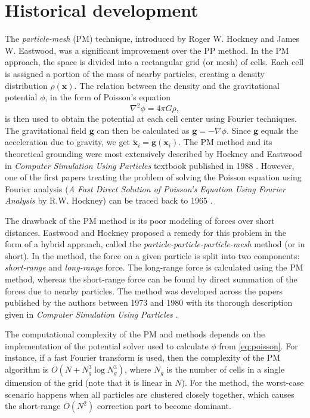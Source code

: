 \section{Historical development}\label{sec:historical-development}
The \textit{particle-mesh} (PM) technique, introduced by Roger W. Hockney and James W. Eastwood, was a significant improvement over the PP method.
In the PM approach, the space is divided into a rectangular grid (or mesh) of cells.
Each cell is assigned a portion of the mass of nearby particles, creating a density distribution $\rho(\mathbf{x})$.
The relation between the density and the gravitational potential $\phi$, in the form of Poisson's equation
\begin{equation}\label{eq:poisson}
    \nabla^2\phi = 4\pi G \rho,
\end{equation}
is then used to obtain the potential at each cell center using Fourier techniques.
The gravitational field $\mathbf{g}$ can then be calculated as $\mathbf{g} = -\nabla \phi$.
Since $\mathbf{g}$ equals the acceleration due to gravity, we get $\ddot{\mathbf{x}}_i = \mathbf{g}(\mathbf{x}_i)$.
The PM method and its theoretical grounding were most extensively described by Hockney and Eastwood in \textit{Computer Simulation Using Particles} textbook published in 1988 \cite{Hockney1988}.
However, one of the first papers treating the problem of solving the Poisson equation using Fourier analysis (\textit{A Fast Direct Solution of Poisson's Equation Using Fourier Analysis} by R.W. Hockney) can be traced back to 1965 \cite{10.1145/321250.321259}.

The drawback of the PM method is its poor modeling of forces over short distances.
Eastwood and Hockney proposed a remedy for this problem in the form of a hybrid approach, called the \textit{particle-particle-particle-mesh} method (or \PThreeM{} in short).
In the \PThreeM{} method, the force on a given particle is split into two components: \textit{short-range} and \textit{long-range} force.
The long-range force is calculated using the PM method, whereas the short-range force can be found by direct summation of the forces due to nearby particles.
The \PThreeM{} method was developed across the papers published by the authors between 1973 and 1980 with its thorough description given in \textit{Computer Simulation Using Particles} \cite{Hockney1988}.

The computational complexity of the PM and \PThreeM{} methods depends on the implementation of the potential solver used to calculate $\phi$ from \autoref{eq:poisson}.
For instance, if a fast Fourier transform is used, then the complexity of the PM algorithm is $O(N + N_g^3\log N_g^3)$, where $N_g$ is the number of cells in a single dimension of the grid (note that it is linear in $N$).
For the \PThreeM{} method, the worst-case scenario happens when all particles are clustered closely together, which causes the short-range $O(N^2)$ correction part to become dominant.


